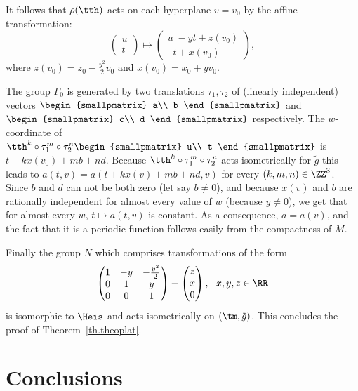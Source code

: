 It follows that $\rho(\tth)$ acts on each hyperplane $v=v_0$ by the affine transformation:
\[
\begin{pmatrix} u\\ t
\end{pmatrix} \mapsto 
\begin{pmatrix} u\;-yt + z(v_0)\\\;\;t+ x(v_0)
\end{pmatrix} ,
\]
where $z(v_0)=z_0 - \frac{y^2}{2}v_0$ and $x(v_0)=x_0 + y v_0$.

The group $\Gamma_0$ is generated by two translations $\tau_1,\tau_2$ of (linearly independent) vectors $
\begin{smallpmatrix} a\\ b
\end{smallpmatrix}$ and $\begin{smallpmatrix} c\\ d
\end{smallpmatrix}$ respectively.
The $w$-coordinate of $\tth^k\circ \tau_1^m \circ \tau_2 ^n
\begin{smallpmatrix} u\\ t
\end{smallpmatrix}$
is $t+k x(v_0)+mb+nd$. Because $\tth^k\circ \tau_1^m \circ \tau_2 ^n$ acts isometrically for $\tilde{g}$ this leads to $a(t,v)=a(t+k x(v)+mb+nd,v)$ for every $(k,m,n) \in \ZZ^3$. Since $b$ and $d$ can not be both zero (let say $b \not =0$), and because $x(v)$ and $b$ are rationally independent for almost every value of $w$ (because $y \not =0$), we get that for almost every $w$, $t \mapsto a(t,v)$ is constant. As a consequence, $a=a(v)$, and the fact that it is a periodic function follows easily from the compactness of $M$.

Finally the group $N$ which comprises transformations of the form
\[
\begin{pmatrix}
1&- y&-\frac{ y^2}{2 }\\ 0&1 & y\\0&0& 1\\
\end{pmatrix} +
\begin{pmatrix} z\\ x\\ 0 \\
\end{pmatrix}, \ \ x,y,z \in \RR
\]
is isomorphic to $\Heis$ and acts isometrically on $(\tm,\tilde{g})$. This concludes the proof of Theorem~\ref{th.theoplat}.


\section{Conclusions}\label{sec.fin}

